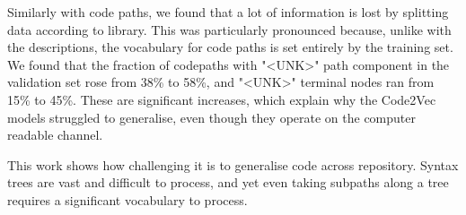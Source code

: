 Similarly with code paths, we found that a lot of information is lost by splitting data according to library. This was particularly pronounced because, unlike with the descriptions, the vocabulary for code paths is set entirely by the training set.
We found that the fraction of codepaths with "<UNK>" path component in the validation set rose from 38\% to 58\%, and "<UNK>" terminal nodes ran from 15\% to 45\%. 
These are significant increases, which explain why the Code2Vec models struggled to generalise, even though they operate on the computer readable channel. 

This work shows how challenging it is to generalise code across repository. Syntax trees are vast and difficult to process, and yet even taking subpaths along a tree requires a significant vocabulary to process.


















